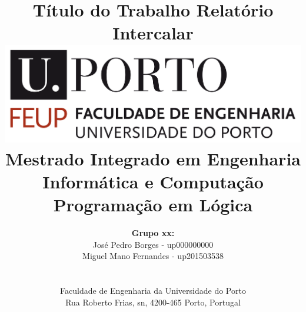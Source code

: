 \documentclass[a4paper]{article}
\begin{document}
\setlength{\textwidth}{16cm}
\setlength{\textheight}{22cm}

\title{\Huge\textbf{Título do Trabalho}\linebreak\linebreak\linebreak
\Large\textbf{Relatório Intercalar}\linebreak\linebreak
\linebreak\linebreak
\includegraphics[scale=0.1]{feup-logo.png}\linebreak\linebreak
\linebreak\linebreak
\Large{Mestrado Integrado em Engenharia Informática e Computação} \linebreak\linebreak
\Large{Programação em Lógica}\linebreak
}

\author{\textbf{Grupo xx:}\\
José Pedro Borges - up000000000 \\
Miguel Mano Fernandes - up201503538 \\
\linebreak\linebreak \\
 \\ Faculdade de Engenharia da Universidade do Porto \\ Rua Roberto Frias, s\/n, 4200-465 Porto, Portugal \linebreak\linebreak\linebreak
\linebreak\linebreak\vspace{1cm}}

\maketitle
\thispagestyle{empty}
\end{document}
